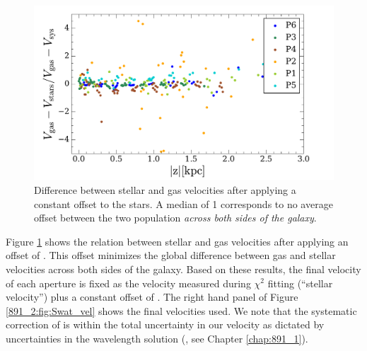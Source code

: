 


\begin{figure}[t]
  \centering
  \includegraphics[width=\columnwidth]{891_2/figs/SG_diff.pdf}
  \caption[Offset between stellar and gas
    velocities]{\fixspacing\label{891_2:fig:SG_offset}Difference
    between stellar and gas velocities after applying a constant
     offset to the stars. A median of 1 corresponds to
    no average offset between the two population \emph{across both
      sides of the galaxy}.}
\end{figure}

Figure \ref{891_2:fig:SG_offset} shows the relation between stellar
and gas velocities after applying an offset of . This
offset minimizes the global difference between gas and stellar
velocities across both sides of the galaxy. Based on these results,
the final velocity of each aperture is fixed as the velocity measured
during $\chi^2$ fitting (``stellar velocity'') plus a constant offset
of . The right hand panel of Figure
\ref{891_2:fig:Swat_vel} shows the final velocities used. We note that
the systematic correction of  is within the total
uncertainty in our velocity as dictated by uncertainties in the
wavelength solution (, see Chapter \ref{chap:891_1}).

